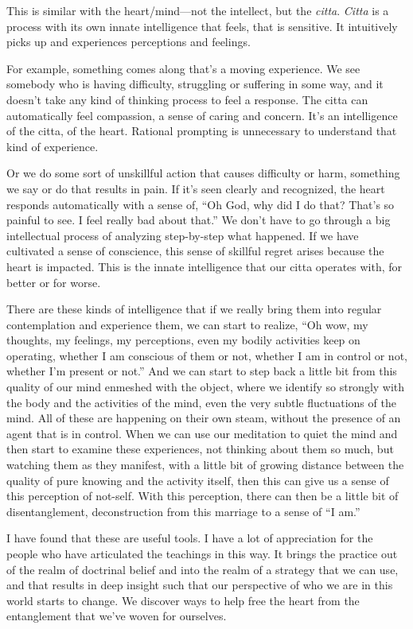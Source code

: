 This is similar with the heart/mind---not the intellect, but the \emph{citta}. \emph{Citta} is a process with its own innate intelligence that feels, that is sensitive. It intuitively picks up and experiences perceptions and feelings.

For example, something comes along that's a moving experience. We see somebody who is having difficulty, struggling or suffering in some way, and it doesn't take any kind of thinking process to feel a response. The citta can automatically feel compassion, a sense of caring and concern. It's an intelligence of the citta, of the heart. Rational prompting is unnecessary to understand that kind of experience.

Or we do some sort of unskillful action that causes difficulty or harm, something we say or do that results in pain. If it's seen clearly and recognized, the heart responds automatically with a sense of, ``Oh God, why did I do that? That's so painful to see. I feel really bad about that.'' We don't have to go through a big intellectual process of analyzing step-by-step what happened. If we have cultivated a sense of conscience, this sense of skillful regret arises because the heart is impacted. This is the innate intelligence that our citta operates with, for better or for worse.

There are these kinds of intelligence that if we really bring them into regular contemplation and experience them, we can start to realize, ``Oh wow, my thoughts, my feelings, my perceptions, even my bodily activities keep on operating, whether I am conscious of them or not, whether I am in control or not, whether I'm present or not.'' And we can start to step back a little bit from this quality of our mind enmeshed with the object, where we identify so strongly with the body and the activities of the mind, even the very subtle fluctuations of the mind. All of these are happening on their own steam, without the presence of an agent that is in control. When we can use our meditation to quiet the mind and then start to examine these experiences, not thinking about them so much, but watching them as they manifest, with a little bit of growing distance between the quality of pure knowing and the activity itself, then this can give us a sense of this perception of not-self. With this perception, there can then be a little bit of disentanglement, deconstruction from this marriage to a sense of ``I am.''

I have found that these are useful tools. I have a lot of appreciation for the people who have articulated the teachings in this way. It brings the practice out of the realm of doctrinal belief and into the realm of a strategy that we can use, and that results in deep insight such that our perspective of who we are in this world starts to change. We discover ways to help free the heart from the entanglement that we've woven for ourselves.

